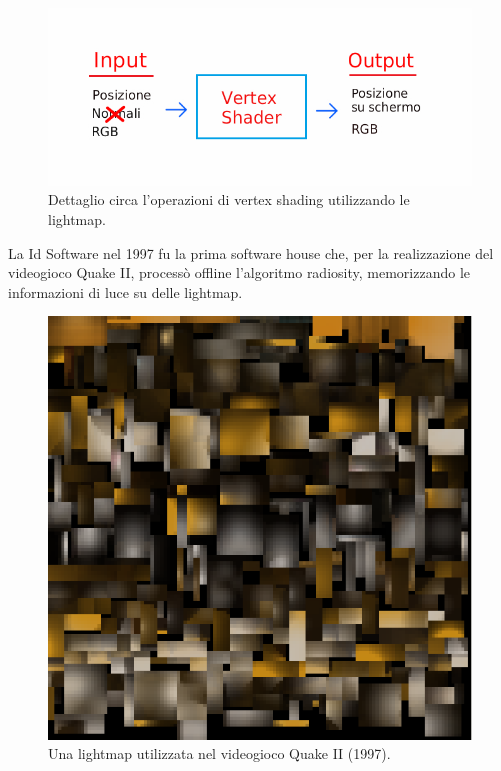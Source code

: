 \\
\begin{figure}[htb]
 \centering
 \includegraphics[width=0.8\linewidth]{images/chapter_stato_arte/stato_arte_ver_sh.jpg}\hfill
 \caption[Vertex shading lightmap]{Dettaglio circa l'operazioni di vertex shading utilizzando le lightmap.}
 \label{fig:stato_arte_ver_sh}
\end{figure}

La Id Software nel 1997 fu la prima 
software house che, per la realizzazione del videogioco Quake II, processò offline l’algoritmo radiosity, memorizzando le informazioni di luce su delle lightmap.
\\
\begin{figure}[htb]
 \centering
 \includegraphics[width=0.5\linewidth]{images/chapter_stato_arte/stato_arte_quake_lightmap.png}\hfill
 \caption[Lightmap Quake II]{Una lightmap utilizzata nel videogioco Quake II (1997).}
 \label{fig:stato_arte_quake_lightmap}
\end{figure}

